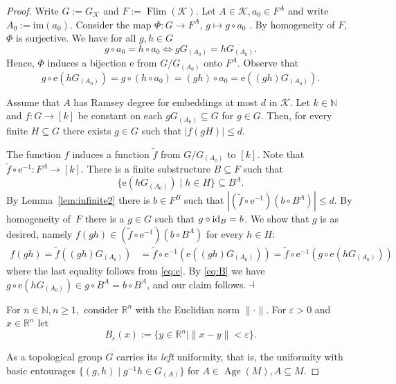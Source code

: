 \documentclass[12pt]{amsart}
\theoremstyle{plain}
\theoremstyle{definition}
\begin{document}
\begin{proof}
Write $G:=G_{\mathcal K}$ and $F:=\operatorname{Flim}({\mathcal K})$. Let $A\in{\mathcal K}, a_0\in F^A$ and write $A_0:={\mathrm{im}}(a_0)$. 
Consider the map $\Phi: G\rightarrow F^A$, $g\mapsto g\circ a_0$ . 
By homogeneity of $F$, $\Phi$ is surjective. We have for all $g,h\in G$
$$g\circ a_0=h\circ a_0\Longleftrightarrow gG_{(A_0)}=hG_{(A_0)}.$$
Hence, $\Phi$ induces a bijection ${\mathrm{e}}$ from $G/G_{(A_0)}$ onto $F^A$. Observe that 
\begin{equation}\label{eq:e}
g\circ {\mathrm{e}}(hG_{(A_0)})=g\circ (h \circ a_0)= (gh)\circ a_0={\mathrm{e}}((gh)G_{(A_0)}). 
\end{equation}

 Assume that $A$ has Ramsey degree  for embeddings at most $d$ in ${\mathcal K}$. 
Let $k\in{\mathbb N}$ and $f:G\to [k]$ be constant on each $gG_{(A_0)}\subseteq G$ for $g\in G$. Then, for every finite $H\subseteq G$ there exists $g\in G$ such that $|f(gH)|\le d$.\medskip

 The function $f$ induces a function $\tilde f$ from 
$G/G_{(A_0)}$ to $[k]$. Note that $\tilde f\circ {\mathrm{e}}^{-1}:F^A\to [k]$. 
There is a finite substructure $B\subseteq F$ such that  
\begin{equation}\label{eq:B}
\{{\mathrm{e}}(hG_{(A_0)})\mid h\in H\}\subseteq B^A.
\end{equation}
By Lemma~\ref{lem:infinite2} there is $b\in F^B$ such that $|(\tilde f\circ {\mathrm{e}}^{-1})(b\circ B^A)|\le d$.
By homogeneity of~$F$ there is a $g\in G$ such that $g\circ \textup{id}_B=b$.
We show that $g$ is as desired, namely $f(gh)\in (\tilde f\circ {\mathrm{e}}^{-1})(b\circ B^A)$ for every $h\in H$: 
\begin{align*}
f(gh)=\tilde f((gh)G_{(A_0)})&=\tilde f\circ {\mathrm{e}}^{-1} ({\mathrm{e}}((gh)G_{(A_0)}))
=\tilde f\circ {\mathrm{e}}^{-1} (g \circ {\mathrm{e}}(hG_{(A_0)})  )
\end{align*}
where the last equality follows from \eqref{eq:e}. By \eqref{eq:B} we have 
$g\circ {\mathrm{e}}(hG_{(A_0)})\in g\circ B^A= b\circ B^A$, and our claim follows.\hfill$\dashv$\medskip

For $n\in{\mathbb N},n\ge 1,$ consider $\mathbb R^n$ with the Euclidian norm $\|\cdot\|$. For $\varepsilon>0$ and $x\in\mathbb R^n$ let $$B_{\varepsilon}(x) :=\{y\in \mathbb R^n\mid \|x-y\|<\varepsilon\}.$$

As a topological group $G$ carries its {\em left} uniformity, that is, the uniformity with basic entourages $\{(g,h)\mid g^{-1}h\in G_{(A)}\}$ for $A\in\operatorname{Age}(M), A\subseteq M$.
\medskip


\end{proof}
\end{document}
